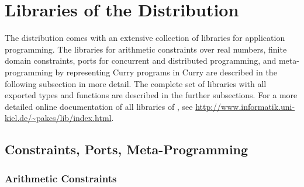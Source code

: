 \section{Libraries of the \CYS Distribution}
\label{sec:libraries}

{\setlength{\parindent}{0.0cm}

The \CYS distribution comes with an extensive collection
of libraries for application programming.
The libraries for arithmetic constraints over real numbers,
finite domain constraints,
ports for concurrent and distributed programming, and
meta-programming by representing Curry programs in Curry
are described in the following subsection in more detail.
The complete set of libraries with all exported types and functions
are described in the further subsections.
For a more detailed online documentation of all libraries of \CYS,
see \url{http://www.informatik.uni-kiel.de/~pakcs/lib/index.html}.

\subsection{Constraints, Ports, Meta-Programming}

\subsubsection{Arithmetic Constraints}

}
